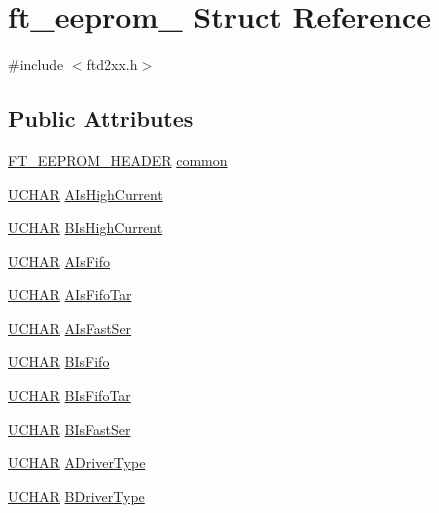 \hypertarget{structft__eeprom__2232}{}\section{ft\+\_\+eeprom\+\_ Struct Reference}
\label{structft__eeprom__2232}


{\ttfamily \#include $<$ftd2xx.\+h$>$}

\subsection*{Public Attributes}
\begin{DoxyCompactItemize}
\item 
\hyperlink{LALUsbMLx64_2include_2ftd2xx_8h_ad5a6f519cd67a403fd8742756462394e}{F\+T\+\_\+\+E\+E\+P\+R\+O\+M\+\_\+\+H\+E\+A\+D\+ER} \hyperlink{structft__eeprom__2232_a6b294dc09899eb022f2e949b3d5c4972}{common}
\item 
\hyperlink{CatCaloProto40MHz_2inc_2WinTypes_8h_a4f4bb67531a9bf6f0b9c6ad76aeba587}{U\+C\+H\+AR} \hyperlink{structft__eeprom__2232_a66f55cd8947dc7015515038a35495ddc}{A\+Is\+High\+Current}
\item 
\hyperlink{CatCaloProto40MHz_2inc_2WinTypes_8h_a4f4bb67531a9bf6f0b9c6ad76aeba587}{U\+C\+H\+AR} \hyperlink{structft__eeprom__2232_a2d7b4af1ab0e3b0084e13b83f513b5d5}{B\+Is\+High\+Current}
\item 
\hyperlink{CatCaloProto40MHz_2inc_2WinTypes_8h_a4f4bb67531a9bf6f0b9c6ad76aeba587}{U\+C\+H\+AR} \hyperlink{structft__eeprom__2232_acf4ea789894df80107249291ac055a6f}{A\+Is\+Fifo}
\item 
\hyperlink{CatCaloProto40MHz_2inc_2WinTypes_8h_a4f4bb67531a9bf6f0b9c6ad76aeba587}{U\+C\+H\+AR} \hyperlink{structft__eeprom__2232_a6b3aab2f52076295cc32a5a785194b78}{A\+Is\+Fifo\+Tar}
\item 
\hyperlink{CatCaloProto40MHz_2inc_2WinTypes_8h_a4f4bb67531a9bf6f0b9c6ad76aeba587}{U\+C\+H\+AR} \hyperlink{structft__eeprom__2232_acbcbf6335afad8a22eac6a575f385785}{A\+Is\+Fast\+Ser}
\item 
\hyperlink{CatCaloProto40MHz_2inc_2WinTypes_8h_a4f4bb67531a9bf6f0b9c6ad76aeba587}{U\+C\+H\+AR} \hyperlink{structft__eeprom__2232_a090431f3dee969f1fd88cf30aabffe2f}{B\+Is\+Fifo}
\item 
\hyperlink{CatCaloProto40MHz_2inc_2WinTypes_8h_a4f4bb67531a9bf6f0b9c6ad76aeba587}{U\+C\+H\+AR} \hyperlink{structft__eeprom__2232_a576a9319f978ff28d3bb0a042d6196a8}{B\+Is\+Fifo\+Tar}
\item 
\hyperlink{CatCaloProto40MHz_2inc_2WinTypes_8h_a4f4bb67531a9bf6f0b9c6ad76aeba587}{U\+C\+H\+AR} \hyperlink{structft__eeprom__2232_a33a65a0fbacf825f9af5903b834b9ab2}{B\+Is\+Fast\+Ser}
\item 
\hyperlink{CatCaloProto40MHz_2inc_2WinTypes_8h_a4f4bb67531a9bf6f0b9c6ad76aeba587}{U\+C\+H\+AR} \hyperlink{structft__eeprom__2232_ad86a60a990160e5976e563365b7d05d0}{A\+Driver\+Type}
\item 
\hyperlink{CatCaloProto40MHz_2inc_2WinTypes_8h_a4f4bb67531a9bf6f0b9c6ad76aeba587}{U\+C\+H\+AR} \hyperlink{structft__eeprom__2232_a74407077c9097bf480f560b0511daf79}{B\+Driver\+Type}
\end{DoxyCompactItemize}



